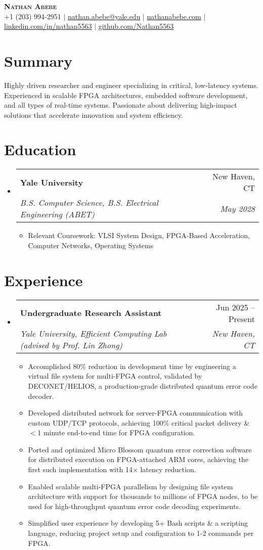 \documentclass[letterpaper,11pt]{article}
\makeatletter
\newcommand{\resumeItem}[1]{
  \item\small{
    {#1 \vspace{-2pt}}
  }
}
\newcommand{\resumeSummary}[1]{
    #1
}
\newcommand{\resumeSubheading}[4]{
  \vspace{-2pt}\item
    \begin{tabular*}{0.97\textwidth}[t]{l@{\extracolsep{\fill}}r}
      \textbf{#1} & #2 \\
      \textit{\small#3} & \textit{\small #4} \\
    \end{tabular*}\vspace{-7pt}
}
\newcommand{\resumeSubHeadingListStart}{\begin{itemize}[leftmargin=0.15in, label={}]}
\newcommand{\resumeSubHeadingListEnd}{\end{itemize}}
\newcommand{\resumeItemListStart}{\begin{itemize}}
\newcommand{\resumeItemListEnd}{\end{itemize}\vspace{-5pt}}
\makeatother
\begin{document}
\begin{center}
    \textbf{\Huge \scshape Nathan Abebe} \\ \vspace{5pt}
    \small +1 (203) 994-2951 $|$ \href{mailto:nathan.abebe@yale.edu}{nathan.abebe@yale.edu} $|$ \href{https://nathanabebe.com}{nathanabebe.com} $|$ 
    \href{https://linkedin.com/in/nathan5563}{linkedin.com/in/nathan5563} $|$
    \href{https://github.com/Nathan5563}{github.com/Nathan5563}
\end{center}

\section{Summary}
    \resumeSummary{Highly driven researcher and engineer specializing in critical, low-latency systems. Experienced in scalable FPGA architectures, embedded software development, and all types of real-time systems. Passionate about delivering high-impact solutions that accelerate innovation and system efficiency.}

\section{Education}
  \resumeSubHeadingListStart
    \resumeSubheading
      {Yale University}{New Haven, CT}
      {B.S. Computer Science, B.S. Electrical Engineering (ABET)}{May 2028}
      \resumeItemListStart
        \resumeItem{Relevant Coursework: VLSI System Design, FPGA-Based Acceleration, Computer Networks, Operating Systems }
      \resumeItemListEnd
  \resumeSubHeadingListEnd


\section{Experience}
  \resumeSubHeadingListStart
    \resumeSubheading
      {Undergraduate Research Assistant}{Jun 2025 -- Present}
      {Yale University, Efficient Computing Lab (advised by Prof. Lin Zhong)}{New Haven, CT}
      \resumeItemListStart
        \resumeItem{Accomplished 80\% reduction in development time by engineering a virtual file system for multi-FPGA control, validated by DECONET/HELIOS, a production-grade distributed quantum error code decoder.}
        \resumeItem{Developed distributed network for server-FPGA communication with custom UDP/TCP protocols, achieving 100\% critical packet delivery \& $<$1 minute end-to-end time for FPGA configuration.}
        \resumeItem{Ported and optimized Micro Blossom quantum error correction software for distributed execution on FPGA-attached ARM cores, achieving the first such implementation with 14× latency reduction.}
        \resumeItem{Enabled scalable multi-FPGA parallelism by designing file system architecture with support for thousands to millions of FPGA nodes, to be used for high-throughput quantum error code decoding experiments.}
        \resumeItem{Simplified user experience by developing 5+ Bash scripts \& a scripting language, reducing project setup and configuration to 1-2 commands per FPGA.}
      \resumeItemListEnd
  \resumeSubHeadingListEnd
\end{document}
